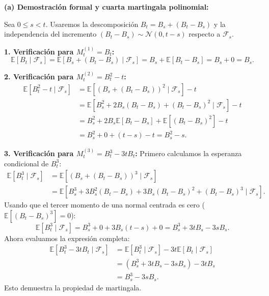 \documentclass[11pt, letterpaper]{article}
\begin{document}
\begin{solucion}
    \vspace{3mm}
    \textbf{(a) Demostración formal y cuarta martingala polinomial:}

    Sea $0 \le s < t$. Usaremos la descomposición $B_t = B_s + (B_t - B_s)$ y la independencia del incremento $(B_t - B_s) \sim \mathcal{N}(0, t-s)$ respecto a $\mathcal{F}_s$.

    \textbf{1. Verificación para $M_t^{(1)} = B_t$:}
    $$ \mathbb{E}[B_t \mid \mathcal{F}_s] = \mathbb{E}[B_s + (B_t - B_s) \mid \mathcal{F}_s] = B_s + \mathbb{E}[B_t - B_s] = B_s + 0 = B_s. $$

    \textbf{2. Verificación para $M_t^{(2)} = B_t^2 - t$:}
    \begin{align*}
        \mathbb{E}[B_t^2 - t \mid \mathcal{F}_s] &= \mathbb{E}[(B_s + (B_t - B_s))^2 \mid \mathcal{F}_s] - t \\
        &= \mathbb{E}[B_s^2 + 2B_s(B_t - B_s) + (B_t - B_s)^2 \mid \mathcal{F}_s] - t \\
        &= B_s^2 + 2B_s\mathbb{E}[B_t - B_s] + \mathbb{E}[(B_t - B_s)^2] - t \\
        &= B_s^2 + 0 + (t - s) - t = B_s^2 - s.
    \end{align*}

    \textbf{3. Verificación para $M_t^{(3)} = B_t^3 - 3tB_t$:}
    Primero calculamos la esperanza condicional de $B_t^3$:
    \begin{align*}
        \mathbb{E}[B_t^3 \mid \mathcal{F}_s] &= \mathbb{E}[(B_s + (B_t - B_s))^3 \mid \mathcal{F}_s] \\
        &= \mathbb{E}[B_s^3 + 3B_s^2(B_t - B_s) + 3B_s(B_t - B_s)^2 + (B_t - B_s)^3 \mid \mathcal{F}_s].
    \end{align*}
    Usando que el tercer momento de una normal centrada es cero ($\mathbb{E}[(B_t-B_s)^3]=0$):
    $$ \mathbb{E}[B_t^3 \mid \mathcal{F}_s] = B_s^3 + 0 + 3B_s(t - s) + 0 = B_s^3 + 3tB_s - 3sB_s. $$
    Ahora evaluamos la expresión completa:
    \begin{align*}
        \mathbb{E}[B_t^3 - 3tB_t \mid \mathcal{F}_s] &= \mathbb{E}[B_t^3 \mid \mathcal{F}_s] - 3t\mathbb{E}[B_t \mid \mathcal{F}_s] \\
        &= (B_s^3 + 3tB_s - 3sB_s) - 3tB_s \\
        &= B_s^3 - 3sB_s.
    \end{align*}
    Esto demuestra la propiedad de martingala.


\end{solucion}
\end{document}
